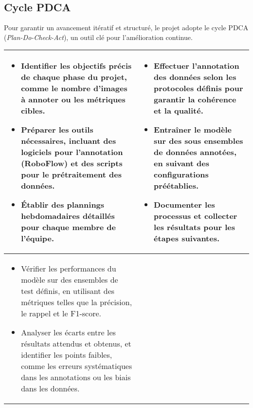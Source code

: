 \subsection{Cycle PDCA}
Pour garantir un avancement itératif et structuré, le projet adopte le cycle PDCA (\textit{Plan-Do-Check-Act}), un outil clé pour l’amélioration continue.
\begin{table}  
    \centering  
    \begin{tabular}{|p{7cm}|p{7cm}|}  
    \hline 
    \centering
    \begin{itemize}
    \item Identifier les objectifs précis de chaque phase du projet, comme le nombre d’images à annoter ou les métriques cibles. 
    \item Préparer les outils nécessaires, incluant des logiciels pour l’annotation (RoboFlow) et des scripts pour le prétraitement des données. 
    \item Établir des plannings hebdomadaires détaillés pour chaque membre de l’équipe. 
    \end{itemize}&
    \begin{itemize}
        \item Effectuer l’annotation des données selon les protocoles définis pour garantir la cohérence et la qualité. 
        \item Entraîner le modèle sur des sous ensembles de données annotées, en suivant des configurations préétablies. 
        \item Documenter les processus et collecter les résultats pour les étapes suivantes.   
    \end{itemize}\\
    \hline  
    \centering
    \begin{itemize}
    \item Vérifier les performances du modèle sur des ensembles de test définis, en utilisant des métriques telles que la précision, le rappel et le F1-score. 
    \item Analyser les écarts entre les résultats attendus et obtenus, et identifier les points faibles, comme les erreurs systématiques dans les annotations ou les biais dans les données.   
    \end{itemize}&
    \begin{itemize}

\end{itemize}
\end{tabular}
\end{table}
